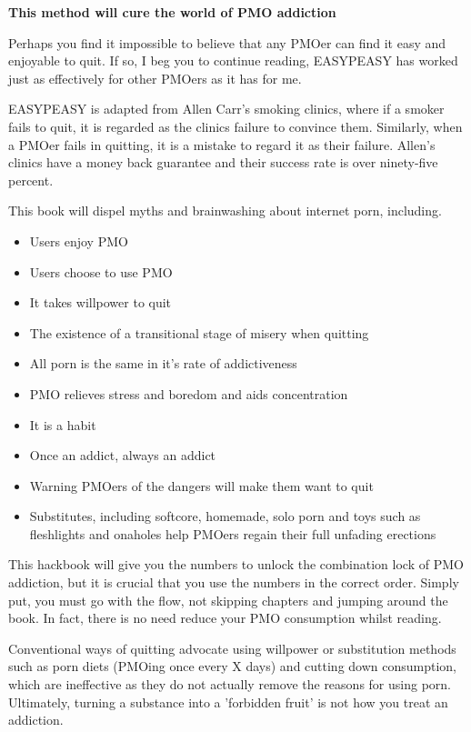 \documentclass[easypeasy.tex]{subfiles}
\begin{document}
\textbf{This method will cure the world of PMO addiction}

Perhaps you find it impossible to believe that any PMOer can find it easy and enjoyable to quit. If so, I beg you to continue reading, EASYPEASY has worked just as effectively for other PMOers as it has for me.

EASYPEASY is adapted from Allen Carr's smoking clinics, where if a smoker fails to quit, it is regarded as the clinics failure to convince them. Similarly, when a PMOer fails in quitting, it is a mistake to regard it as their failure. Allen's clinics have a money back guarantee and their success rate is over ninety-five percent.

This book will dispel myths and brainwashing about internet porn, including.
  \begin{itemize}
  \item Users enjoy PMO
  \item Users choose to use PMO
  \item It takes willpower to quit
  \item The existence of a transitional stage of misery when quitting
  \item All porn is the same in it's rate of addictiveness
  \item PMO relieves stress and boredom and aids concentration
  \item It is a habit
  \item Once an addict, always an addict
  \item Warning PMOers of the dangers will make them want to quit
  \item Substitutes, including softcore, homemade, solo porn and toys such as fleshlights and onaholes help PMOers regain their full unfading erections
\end{itemize}
This hackbook will give you the numbers to unlock the combination lock of PMO addiction, but it is crucial that you use the numbers in the correct order. Simply put, you must go with the flow, not skipping chapters and jumping around the book. In fact, there is no need reduce your PMO consumption whilst reading.

Conventional ways of quitting advocate using willpower or substitution methods such as porn diets (PMOing once every X days) and cutting down consumption, which are ineffective as they do not actually remove the reasons for using porn. Ultimately, turning a substance into a 'forbidden fruit' is not how you treat an addiction.
\end{document}
